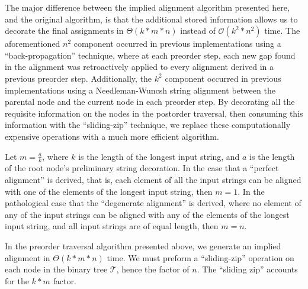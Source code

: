 \documentclass[11pt]{article}
\begin{document}
%
%

The major difference between the implied alignment algorithm presented here, and the original algorithm, is that the additional stored information allows us to decorate the final assignments in $\Theta(k * m * n)$ instead of $\mathcal{O}(k^2 * n^2)$ time. 
The aforementioned $n^2$ component occurred in previous implementations using a ``back-propagation'' technique, where at each preorder step, each new gap found in the alignment was retroactively applied to every alignment derived in a previous preorder step.
Additionally, the $k^2$ component occurred in previous implementations using a Needleman-Wuncsh string alignment between the parental node and the current node in each preorder step.
By decorating all the requisite information on the nodes in the postorder traversal, then consuming this information with the ``sliding-zip'' technique, we replace these computationally expensive operations with a much more efficient algorithm.

Let $m = \frac{a}{k}$, where $k$ is the length of the longest input string, and $a$ is the length of the root node's preliminary string decoration.
In the case that a ``perfect alignment'' is derived, that is, each element of all the input strings can be aligned with one of the elements of the longest input string, then $m = 1$.
In the pathological case that the ``degenerate alignment'' is derived, where no element of any of the input strings can be aligned with any of the elements of the longest input string, and all input strings are of equal length, then $m = n$.

In the preorder traversal algorithm presented above, we generate an implied alignment in $\Theta(k * m * n)$ time.
We must preform a ``sliding-zip'' operation on each node in the binary tree $\mathcal{T}$, hence the factor of $n$.
The ``sliding zip'' accounts for the $k * m$ factor.
\end{document}
